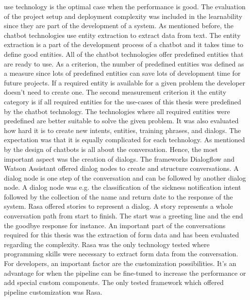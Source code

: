 use technology is the optimal case when the performance is good.
The evaluation of the project setup and deployment complexity was included in 
the learnability since they are part of the development of a system.
As mentioned before, the chatbot technologies use entity extraction to extract data from text.
The entity extraction is a part of the development process of a chatbot
and it takes time to define good entities.
All of the chatbot technologies offer predefined entities that are ready to use.
As a criterion, the number of predefined entities was defined as a measure since 
lots of predefined entities can save lots of development time for future projects.
If a required entity is available for a given problem the developer doesn't need 
to create one.
The second measurement criterion it the entity category is if all required 
entities for the use-cases of this thesis were predefined by the chatbot technology.
The technologies where all required entities were predefined are better suitable 
to solve the given problem.
It was also evaluated how hard it is to create new intents, entities, training phrases,
and dialogs.
The expectation was that it is equally complicated for each technology.
As mentioned by \citet{folstad2017chatbots} the design of chatbots is all about the
conversation.
Hence, the most important aspect was the creation of dialogs.
The frameworks Dialogflow and Watson Assistant offered dialog nodes 
to create and structure conversations.
A dialog node is one step of the conversation and can be followed by another 
dialog node.
A dialog node was e.g. the classification of the sickness notification intent
followed by the collection of the name and return date to the response of the system.
Rasa offered stories to represent a dialog.
A story represents a whole conversation path from start to finish.
The start was a greeting line and the end the goodbye response for instance.
An important part of the conversations required for this thesis was the 
extraction of form data and has been evaluated regarding the 
complexity.
Rasa was the only technology tested where programming skills were necessary to
extract form data from the conversation. 
For developers, an important factor are the customization possibilities.
It's an advantage for when the pipeline can be fine-tuned to increase the 
performance or add special custom components.
The only tested framework which offered pipeline customization was Rasa.
